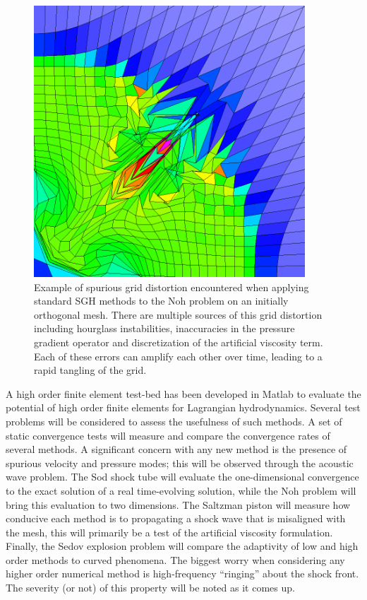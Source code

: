 \begin{figure}[h!]
 \centering
 \includegraphics[width=4in,keepaspectratio=true]{./Figures/Noh_SymmetryBreak.png}
 \caption{Example of spurious grid distortion encountered when applying standard SGH methods to the Noh problem on an initially orthogonal mesh. There are multiple sources of this grid distortion including hourglass instabilities, inaccuracies in the pressure gradient operator and discretization of the artiﬁcial viscosity term. Each of these errors can amplify each other over time, leading to a rapid tangling of the grid.}
 \label{fig:Noh_SymmetryBreak}
\end{figure}

A high order finite element test-bed has been developed in Matlab to evaluate the potential of high order finite elements for Lagrangian hydrodynamics. Several test problems will be considered to assess the usefulness of such methods. A set of static convergence tests will measure and compare the convergence rates of several methods. A significant concern with any new method is the presence of spurious velocity and pressure modes; this will be observed through the acoustic wave problem. The Sod shock tube will evaluate the one-dimensional convergence to the exact solution of a real time-evolving solution, while the Noh problem will bring this evaluation to two dimensions. The Saltzman piston will measure how conducive each method is to propagating a shock wave that is misaligned with the mesh, this will primarily be a test of the artificial viscosity formulation. Finally, the Sedov explosion problem will compare the adaptivity of low and high order methods to curved phenomena. The biggest worry when considering any higher order numerical method is high-frequency ``ringing'' about the shock front. The severity (or not) of this property will be noted as it comes up.

